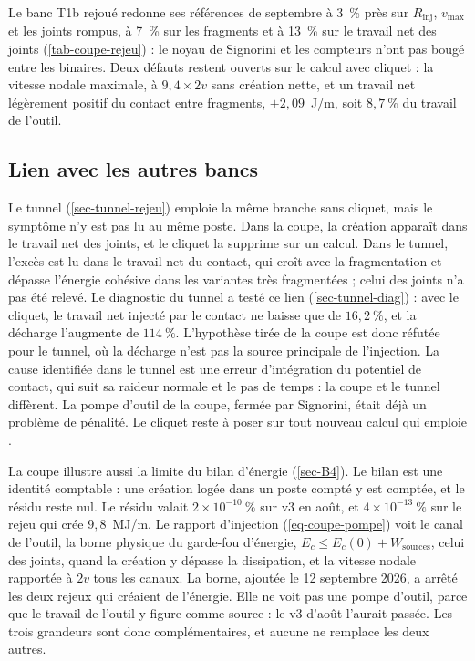 Le banc T1b rejoué redonne ses références de septembre à 3~\% près sur $R_\text{inj}$, $v_\text{max}$ et les joints rompus, à 7~\% sur les fragments et à 13~\% sur le travail net des joints (\cref{tab-coupe-rejeu}) : le noyau de Signorini et les compteurs n'ont pas bougé entre les binaires. Deux défauts restent ouverts sur le calcul avec cliquet : la vitesse nodale maximale, à $9{,}4 \times 2v$ sans création nette, et un travail net légèrement positif du contact entre fragments, $+2{,}09$~J/m, soit $8{,}7~\%$ du travail de l'outil.

\subsection{Lien avec les autres bancs}

Le tunnel (\cref{sec-tunnel-rejeu}) emploie la même branche  sans cliquet, mais le symptôme n'y est pas lu au même poste. Dans la coupe, la création apparaît dans le travail net des joints, et le cliquet la supprime sur un calcul. Dans le tunnel, l'excès est lu dans le travail net du contact, qui croît avec la fragmentation et dépasse l'énergie cohésive dans les variantes très fragmentées ; celui des joints n'a pas été relevé. Le diagnostic du tunnel a testé ce lien (\cref{sec-tunnel-diag}) : avec le cliquet, le travail net injecté par le contact ne baisse que de $16{,}2~\%$, et la décharge  l'augmente de $114~\%$. L'hypothèse tirée de la coupe est donc réfutée pour le tunnel, où la décharge  n'est pas la source principale de l'injection. La cause identifiée dans le tunnel est une erreur d'intégration du potentiel de contact, qui suit sa raideur normale et le pas de temps : la coupe et le tunnel diffèrent. La pompe d'outil de la coupe, fermée par Signorini, était déjà un problème de pénalité. Le cliquet reste à poser sur tout nouveau calcul qui emploie .

La coupe illustre aussi la limite du bilan d'énergie (\cref{sec-B4}). Le bilan est une identité comptable : une création logée dans un poste compté y est comptée, et le résidu reste nul. Le résidu valait $2\times10^{-10}~\%$ sur v3 en août, et $4\times10^{-13}~\%$ sur le rejeu qui crée $9{,}8$~MJ/m. Le rapport d'injection (\cref{eq-coupe-pompe}) voit le canal de l'outil, la borne physique du garde-fou d'énergie, $E_c \leq E_c(0) + W_\text{sources}$, celui des joints, quand la création y dépasse la dissipation, et la vitesse nodale rapportée à $2v$ tous les canaux. La borne, ajoutée le 12 septembre 2026, a arrêté les deux rejeux qui créaient de l'énergie. Elle ne voit pas une pompe d'outil, parce que le travail de l'outil y figure comme source : le v3 d'août l'aurait passée. Les trois grandeurs sont donc complémentaires, et aucune ne remplace les deux autres.

